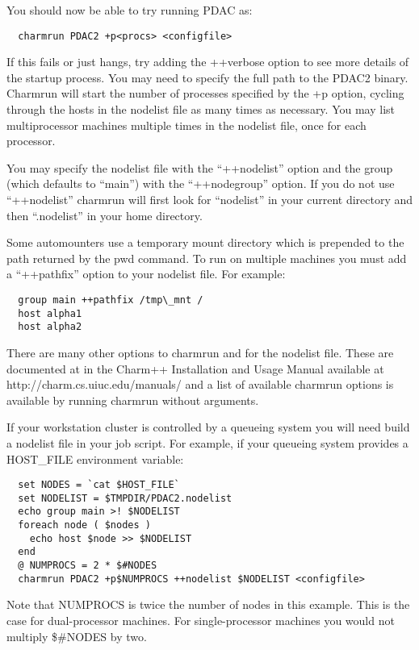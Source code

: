 You should now be able to try running PDAC as:

\begin{verbatim}
  charmrun PDAC2 +p<procs> <configfile>
\end{verbatim}

If this fails or just hangs, try adding the ++verbose option to see
more details of the startup process.  You may need to specify the full
path to the PDAC2 binary.  Charmrun will start the number of processes
specified by the +p option, cycling through the hosts in the nodelist
file as many times as necessary.  You may list multiprocessor machines
multiple times in the nodelist file, once for each processor.

You may specify the nodelist file with the ``++nodelist'' option and the
group (which defaults to ``main'') with the ``++nodegroup'' option.  If
you do not use ``++nodelist'' charmrun will first look for ``nodelist''
in your current directory and then ``.nodelist'' in your home directory.

Some automounters use a temporary mount directory which is prepended
to the path returned by the pwd command.  To run on multiple machines
you must add a ``++pathfix'' option to your nodelist file.  For example:

\begin{verbatim}
  group main ++pathfix /tmp\_mnt /
  host alpha1
  host alpha2
\end{verbatim}

There are many other options to charmrun and for the nodelist file.
These are documented at in the Charm++ Installation and Usage Manual
available at http://charm.cs.uiuc.edu/manuals/ and a list of available
charmrun options is available by running charmrun without arguments.

If your workstation cluster is controlled by a queueing system you
will need build a nodelist file in your job script.  For example, if
your queueing system provides a HOST\_FILE environment variable:

\begin{verbatim}
  set NODES = `cat $HOST_FILE`
  set NODELIST = $TMPDIR/PDAC2.nodelist
  echo group main >! $NODELIST
  foreach node ( $nodes )
    echo host $node >> $NODELIST
  end
  @ NUMPROCS = 2 * $#NODES
  charmrun PDAC2 +p$NUMPROCS ++nodelist $NODELIST <configfile>
\end{verbatim}

Note that NUMPROCS is twice the number of nodes in this example.
This is the case for dual-processor machines.  For single-processor
machines you would not multiply \$\#NODES by two.

